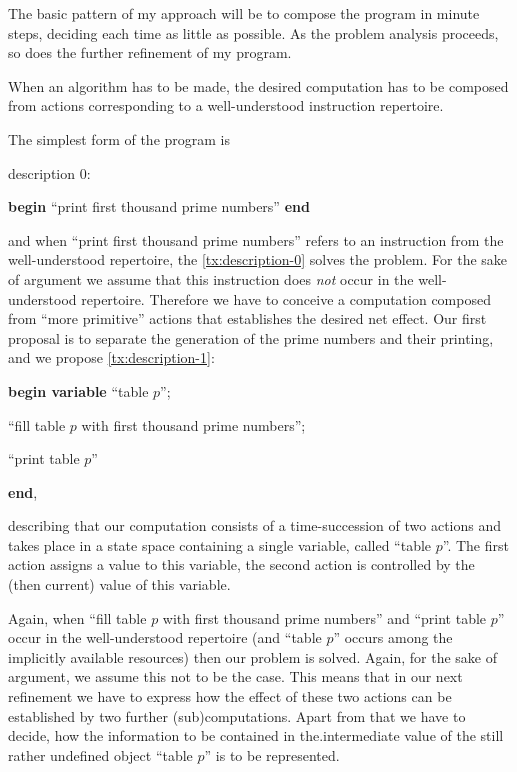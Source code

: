 \documentclass[twoside,11pt]{book}
\makeatletter
\newcommand{\labeltext}[2]{%
	\@bsphack
	\MakeLinkTarget*{#1}%
	\def\@currentlabel{#1}{\label{#2}}%
	\@esphack
}
\makeatother
\begin{document}
The basic pattern of my approach will be to compose the program in minute steps, deciding each time as little as possible. As the problem analysis proceeds, so does the further refinement of my program.

When an algorithm has to be made, the desired computation has to be composed from actions corresponding to a well-understood instruction repertoire.

The simplest form of the program is
\medskip


\noindent
description 0:
\labeltext{description 0}{tx:description-0}

\textbf{begin} ``print first thousand prime numbers'' \textbf{end}

\noindent
and when ``print first thousand prime numbers'' refers to an instruction from the well-understood repertoire, the \ref{tx:description-0} solves the problem. For the sake of argument we assume that this instruction does \textit{not} occur in the well-understood repertoire. Therefore we have to conceive a computation composed from ``more primitive'' actions that establishes the desired net effect. Our first proposal is to separate the generation of the prime numbers and their printing, and we propose \ref{tx:description-1}:
\medskip

\textbf{begin variable} ``table $p$'';
\labeltext{description 1}{tx:description-1}

\quad ``fill table $p$ with first thousand prime numbers'';

\quad ``print table $p$''

\textbf{end},

\noindent
describing that our computation consists of a time-succession of two actions and takes place in a state space containing a single variable, called ``table $p$''. The first action assigns a value to this variable, the second action is controlled by the (then current) value of this variable.

Again, when ``fill table $p$ with first thousand prime numbers'' and ``print table $p$'' occur in the well-understood repertoire (and ``table $p$'' occurs among the implicitly available resources) then our problem is solved. Again, for the sake of argument, we assume this not to be the case. This means that in our next refinement we have to express how the effect of these two actions can be established by two further (sub)computations. Apart from that we have to decide, how the information to be contained in the.intermediate value of the still rather undefined object ``table $p$'' is to be represented.
\end{document}
